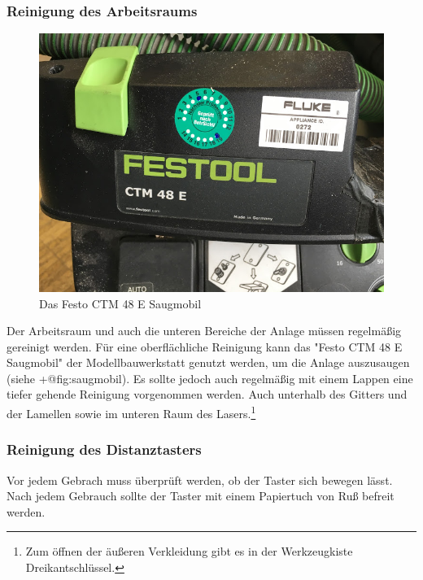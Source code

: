 \documentclass[]{article}
\begin{document}
\hypertarget{reinigung-des-arbeitsraums}{%
\subsubsection{Reinigung des
Arbeitsraums}\label{reinigung-des-arbeitsraums}}

\begin{figure}
\hypertarget{fig:saugmobil}{%
\centering
\includegraphics{assets/images/festo-saugmobil.jpg}
\caption{Das Festo CTM 48 E Saugmobil}\label{fig:saugmobil}
}
\end{figure}

Der Arbeitsraum und auch die unteren Bereiche der Anlage müssen
regelmäßig gereinigt werden. Für eine oberflächliche Reinigung kann das
"Festo CTM 48 E Saugmobil" der Modellbauwerkstatt genutzt werden, um die
Anlage auszusaugen (siehe +@fig:saugmobil). Es sollte jedoch auch
regelmäßig mit einem Lappen eine tiefer gehende Reinigung vorgenommen
werden. Auch unterhalb des Gitters und der Lamellen sowie im unteren
Raum des Lasers.\footnote{Zum öffnen der äußeren Verkleidung gibt es in
  der Werkzeugkiste Dreikantschlüssel.}

\hypertarget{reinigung-des-distanztasters}{%
\subsubsection{Reinigung des
Distanztasters}\label{reinigung-des-distanztasters}}

Vor jedem Gebrach muss überprüft werden, ob der Taster sich bewegen
lässt. Nach jedem Gebrauch sollte der Taster mit einem Papiertuch von
Ruß befreit werden.
\end{document}
